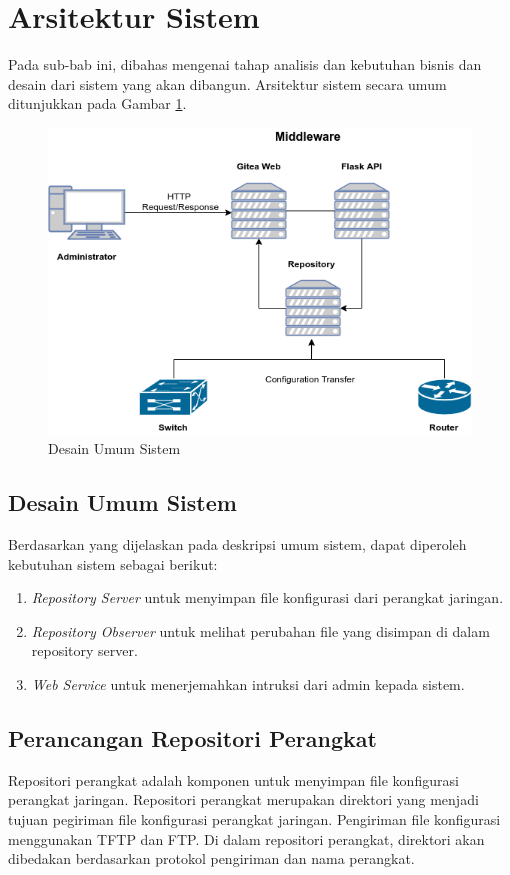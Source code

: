 	\section{Arsitektur Sistem}
		Pada sub-bab ini, dibahas mengenai tahap analisis dan kebutuhan bisnis dan desain dari sistem yang akan dibangun. Arsitektur sistem secara umum ditunjukkan pada Gambar \ref{DesainUmumSistem}.\\
		\begin{figure}[H]
			\centering
			\includegraphics[width=\textwidth]{Images/C-3/Desain-Umum-TA-2.png}
			\caption{Desain Umum Sistem}
			\label{DesainUmumSistem}
		\end{figure}

		\subsection{Desain Umum Sistem}
			Berdasarkan yang dijelaskan pada deskripsi umum sistem, dapat diperoleh kebutuhan sistem sebagai berikut:
			\begin{enumerate}
				\item \textit{Repository Server} untuk menyimpan file konfigurasi dari perangkat jaringan.
				\item \textit{Repository Observer} untuk melihat perubahan file yang disimpan di dalam repository server.
				\item \textit{Web Service} untuk menerjemahkan intruksi dari admin kepada sistem.
			\end{enumerate}
                
                
		\subsection{Perancangan Repositori Perangkat }
			Repositori perangkat adalah komponen untuk menyimpan file konfigurasi perangkat jaringan. Repositori perangkat merupakan direktori yang menjadi tujuan pegiriman file konfigurasi perangkat jaringan. Pengiriman file konfigurasi menggunakan TFTP dan FTP. Di dalam repositori perangkat, direktori akan dibedakan berdasarkan protokol pengiriman dan nama perangkat.\\ 

